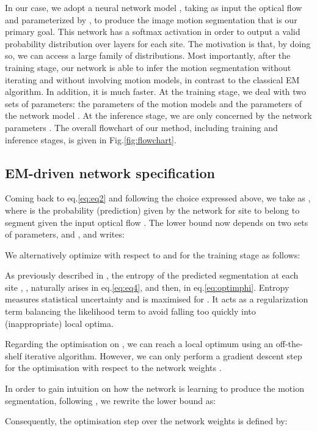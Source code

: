 \documentclass[10pt,twocolumn,letterpaper]{article}
\begin{document}
In our case, we adopt a neural network model , taking as input the optical flow  and parameterized by , to produce the image motion segmentation that is our primary goal. {\color{black} This network has a softmax activation in order to output a valid probability distribution over layers for each site.}
The motivation is that, by doing so, we can access a large family of distributions. Most importantly, after the training stage, our network is able to infer the motion segmentation without iterating and without involving motion models,
in contrast to the classical EM algorithm. In addition, it is much faster. At the training stage, we deal with two sets of parameters: the parameters of the motion models  and the parameters of the network model . At the inference stage, we are only concerned by the network parameters .
The overall flowchart of our method, including training and inference stages, is given in Fig.\ref{fig:flowchart}.

\subsection{EM-driven network specification}
\label{sec:EMNet}

Coming back to eq.\eqref{eq:eq2} and following the choice expressed above, we take  as , where  is the probability (prediction) given by the network for site  to belong to segment  given the input optical flow .
The lower bound now depends on two sets of parameters,  and , and writes:

We alternatively optimize  with respect to  and  for the training stage as follows:

As previously described in \cite{hathaway1986}, the entropy of the predicted segmentation at each site , , naturally arises in eq.\eqref{eq:eq4}, and then, in eq.\eqref{eq:optimphi}. Entropy measures statistical uncertainty and is maximised for . It acts as a regularization term balancing the likelihood term to avoid falling too quickly into (inappropriate) local optima. 

Regarding the optimisation on , we can reach a local optimum using an off-the-shelf iterative algorithm. However, we can only perform a gradient descent step for the optimisation with respect to the network weights .

In order to gain intuition on how the network is learning to produce the motion segmentation, following \cite{murphy_book2012}, we rewrite the lower bound as:

Consequently, the optimisation step over the network weights is defined by: 
\end{document}
